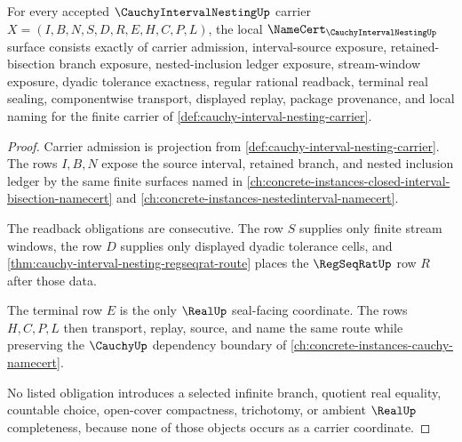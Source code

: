 \begin{theorem}
\label{thm:cauchy-interval-nesting-namecert-obligations}
For every accepted $\CauchyIntervalNestingUp$ carrier $X=(I,B,N,S,D,R,E,H,C,P,L)$, the local $\NameCert_{\CauchyIntervalNestingUp}$ surface consists exactly of carrier admission, interval-source exposure, retained-bisection branch exposure, nested-inclusion ledger exposure, stream-window exposure, dyadic tolerance exactness, regular rational readback, terminal real sealing, componentwise transport, displayed replay, package provenance, and local naming for the finite carrier of \autoref{def:cauchy-interval-nesting-carrier}.
\end{theorem}
\begin{proof}
Carrier admission is projection from \autoref{def:cauchy-interval-nesting-carrier}. The rows $I,B,N$ expose the source interval, retained branch, and nested inclusion ledger by the same finite surfaces named in \autoref{ch:concrete-instances-closed-interval-bisection-namecert} and \autoref{ch:concrete-instances-nestedinterval-namecert}.

The readback obligations are consecutive. The row $S$ supplies only finite stream windows, the row $D$ supplies only displayed dyadic tolerance cells, and \autoref{thm:cauchy-interval-nesting-regseqrat-route} places the $\RegSeqRatUp$ row $R$ after those data.

The terminal row $E$ is the only $\RealUp$ seal-facing coordinate. The rows $H,C,P,L$ then transport, replay, source, and name the same route while preserving the $\CauchyUp$ dependency boundary of \autoref{ch:concrete-instances-cauchy-namecert}.

No listed obligation introduces a selected infinite branch, quotient real equality, countable choice, open-cover compactness, trichotomy, or ambient $\RealUp$ completeness, because none of those objects occurs as a carrier coordinate.
\end{proof}




